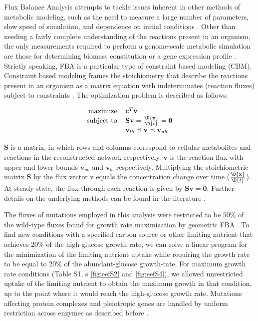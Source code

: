 Flux Balance Analysis attempts to tackle issues inherent in other
methods of metabolic modeling, such as the need to measure a large
number of parameters, slow speed of simulation, and dependence on
initial conditions \citep{Orth2010, Schellenberger2011a}. 
Other than needing a fairly complete
understanding of the reactions present in an organism, the only
measurements required to perform a genome-scale metabolic simulation
are those for determining biomass constitution or a gene expression
profile \citep{Shlomi2005, Mo2009}. Strictly speaking, FBA is a particular type of
constraint based modeling (CBM). Constraint based modeling frames the
stoichiometry that describe the reactions present in an organism as a
matrix equation with indeterminates (reaction fluxes) subject to
constraints \citep{Smallbone2009a, Mo2009}. The optimization problem
is described as follows:


\begin{equation}
\centering
\begin{tabular}{rl}
maximize   & $\mathbf{c}^T\mathbf{v}$                                     \\
subject to & $\mathbf{S v} = \frac{\D{\mathbf{x}}}{\D{t}} = \mathbf{0}$   \\
           & $\mathbf{v}_{lb} \preceq \mathbf{v} \preceq \mathbf{v}_{ub}$ \\
\end{tabular}
\end{equation}

$\mathbf{S}$ is a matrix, in which rows and columns correspond to
cellular metabolites and reactions in the reconstructed network
respectively. $\mathbf{v}$ is the reaction flux with upper and lower
bounds $\mathbf{v}_{ub}$ and $\mathbf{v}_{lb}$
respectively. Multiplying the stoichiometric matrix $\mathbf{S}$ by
the flux vector v equals the concentration change over time
($\frac{\D{\mathbf{x}}}{\D{t}}$). At steady state, the flux through
each reaction is given by $\mathbf{Sv} = \mathbf{0}$. Further details
on the underlying methods can be found in the literature 
\citep{Xu2012, Smallbone2009a, He2010}.

The fluxes of mutations employed in this analysis were restricted to
be 50\% of the wild-type fluxes found for growth rate maximization by
geometric FBA \citep{He2010}. To find new conditions with a specified carbon
source or other limiting nutrient that achieves 20\% of the
high-glucose growth rate, we can solve a linear program for the
minimization of the limiting nutrient uptake while requiring the
growth rate to be equal to 20\% of the abundant-glucose
growth-rate. For maximum growth rate conditions (Table S1, \Fig s \ref{fig:eefS2}
and \ref{fig:eefS4}), we allowed unrestricted uptake of the limiting nutrient to
obtain the maximum growth in that condition, up to the point where it
would reach the high-glucose growth rate. Mutations affecting protein
complexes and pleiotropic genes are handled by uniform restriction
across enzymes as described before \citep{Xu2012}.

